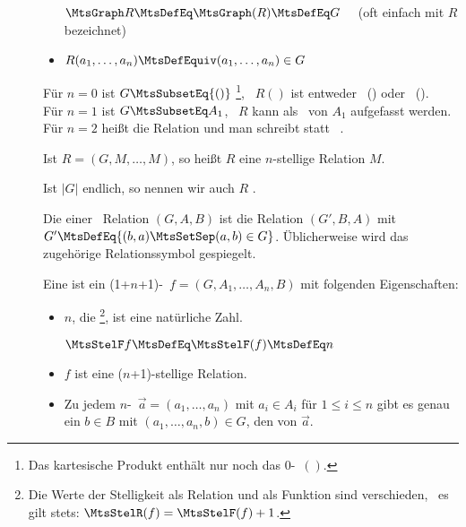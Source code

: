 \begin{description}
\begin{itemize}
		$\MtsGraph R \MtsDefEq \MtsGraph(R) \MtsDefEq G \quad$ (oft einfach mit $R$ bezeichnet)
		\item $R(a_1,\dots,a_n) \MtsDefEquiv (a_1,\dots,a_n) \in G$
	\end{itemize}
	Für $n=0$ ist $G \MtsSubsetEq \{()\}$%
	\footnote{%
		Das kartesische Produkt enthält nur noch das $0$-\Tupel\ $()$.
	},
	\textdh\ $R()$ ist entweder \TxtTrue\ (\MtsTrue) oder \TxtFalse\ (\MtsFalse).
	\\Für $n=1$ ist $G \MtsSubsetEq A_1$, \textdh\ $R$ kann als \Teilmenge\ von $A_1$ aufgefasst werden.
	\\Für $n=2$ heißt die Relation  und man schreibt  statt  \textbzw\ .

	Ist $R=(G,M,\dots,M)$, so heißt $R$ eine $n$-stellige Relation  $M$.

	Ist $|G|$ endlich, so nennen wir auch $R$ .

	\item [\Umkehrrelation] Die   einer \binaeren\ Relation $(G,A,B)$ ist die Relation $(G',B,A)$ mit $G' \MtsDefEq \MengeDef{(b,a)}{(a,b) \in G}$.
	Üblicherweise wird das zugehörige Relationssymbol gespiegelt.

	\item [\Funktion] Eine  ist ein (1+$n$+1)-\Tupel\ $f = (G,A_1,\dots,A_n,B)$ mit folgenden Eigenschaften:
	\begin{itemize}
		\item $n$, die %
		\footnote{%
			Die Werte der Stelligkeit als Relation und als Funktion sind verschieden, \textdh\ es gilt stets: $\MtsStelR(f) = \MtsStelF(f) + 1$.
		},
		ist eine natürliche Zahl.

		$\MtsStelF f \MtsDefEq \MtsStelF(f) \MtsDefEq n$

		\item $f$ ist eine ($n$+1)-stellige Relation.

		\item Zu jedem $n$-\Tupel\ $\vec{a} = (a_1,\dots,a_n)$ mit $a_i \in A_i$ für $1 \le i \le n$ gibt es genau ein $b \in B$ mit $(a_1,\dots,a_n,b) \in G$, den  von $\vec{a}$.


\end{itemize}
\end{description}
